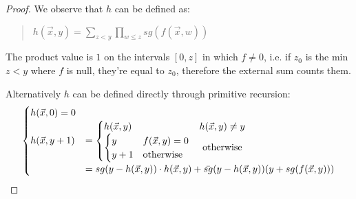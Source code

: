 \begin{proof}
  We observe that $h$ can be defined as:
  
  \begin{quote}
    $h(\vec{x},y) = \sum_{z<y}\prod_{w\leq z} sg(f(\vec{x},w))$
  \end{quote}
  
  The product value is $1$ on the intervals $[0,z]$ in which $f\not= 0$,
  i.e. if $z_0$ is the min $z<y$ where $f$ is null, they're equal to
  $z_0$, therefore the external sum counts them.

  Alternatively $h$ can be defined directly through primitive recursion:
  \[
  \begin{cases}
    h(\vec{x},0) = 0 \\
      h (\vec{x},y+1)
      & =
        \begin{cases}
          h(\vec{x},y)               & h(\vec{x},y)\not= y \\
          \begin{cases}
            y   & f(\vec{x},y) = 0 \\
            y+1 & $otherwise$
          \end{cases} & $ otherwise $
        \end{cases}\\[2mm]
      & =sg(y-h(\vec{x},y)) \cdot h(\vec{x},y) + \bar{sg}(y-h(\vec{x},y))(y+sg(f(\vec{x},y)))
  \end{cases}
  \]
\end{proof}

